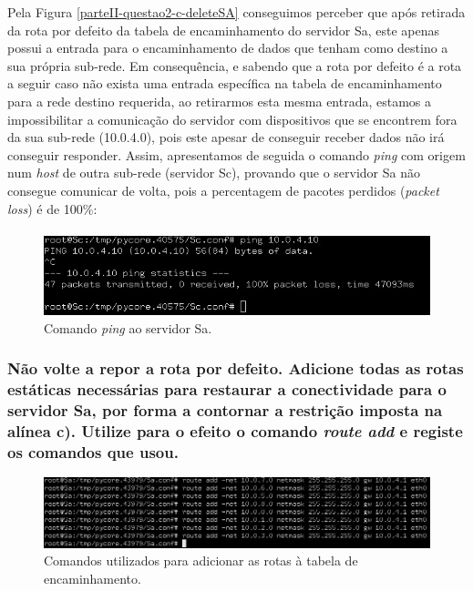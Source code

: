     \par Pela Figura \ref{parteII-questao2-c-deleteSA} conseguimos perceber que após retirada da rota por defeito da tabela de encaminhamento do servidor Sa, este apenas possui a entrada para o encaminhamento de dados que tenham como destino a sua própria sub-rede. Em consequência, e sabendo que a rota por defeito é a rota a seguir caso não exista uma entrada específica na tabela de encaminhamento para a rede destino requerida, ao retirarmos esta mesma entrada, estamos a impossibilitar a comunicação do servidor com dispositivos que se encontrem fora da sua sub-rede (10.0.4.0), pois este apesar de conseguir receber dados não irá conseguir responder. Assim, apresentamos de seguida o comando \textit{ping} com origem num \textit{host} de outra sub-rede (servidor Sc), provando que o servidor Sa não consegue comunicar de volta, pois a percentagem de pacotes perdidos (\textit{packet loss}) é de 100\%:
    
    \paragraph{}
    \begin{figure}[H]
    \centering
    \includegraphics[width=400pt]{images/ParteII/Questao2/questao2-pingSAdeleted.jpg}
    \caption{Comando \textit{ping} ao servidor Sa.} \label{parteII-questao2-Sc-Sa-deleteSA-ping}
    \end{figure} 
    
    
    
\subsubsection{Não volte a repor a rota por defeito. Adicione todas as rotas estáticas necessárias para restaurar a conectividade para o servidor Sa, por forma a contornar a restrição imposta na alínea c). Utilize para o efeito o comando \textit{\textbf{route add}} e registe os comandos que usou.}
    
    \begin{figure}[H]
    \includegraphics[width=\linewidth]{images/ParteII/Questao2/parteII-questao2-d-SA-ADD.jpg}
    \caption{Comandos utilizados para adicionar as rotas à tabela de encaminhamento.} \label{parteII-questao2-d-novoTabelaSA}
    \end{figure} 
    
